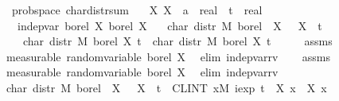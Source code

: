 \documentclass[leqno]{article}
\theoremstyle{definition}
\begin{document}
\begin{isabellebody}
\isamarkupfalse%
\ {\isacharparenleft}\ prob{\isacharunderscore}space{\isacharparenright}\ char{\isacharunderscore}distr{\isacharunderscore}sum{\isacharcolon}\isanewline
\ \ \ X{}\ X{}\ {\isacharcolon}{\isacharcolon}\ {\isachardoublequoteopen}{\isacharprime}a\ {\isasymRightarrow}\ real{\isachardoublequoteclose}\ \ t\ {\isacharcolon}{\isacharcolon}\ real\isanewline
\ \ \ {\isachardoublequoteopen}indep{\isacharunderscore}var\ borel\ X{}\ borel\ X{}{\isachardoublequoteclose}\isanewline
\ \ \ {\isachardoublequoteopen}char\ {\isacharparenleft}distr\ M\ borel\ {\isacharparenleft}{\isasymlambda}{\isasymomega}{\isachardot}\ X{}\ {\isasymomega}\ {\isacharplus}\ X{}\ {\isasymomega}{\isacharparenright}{\isacharparenright}\ t\ {\isacharequal}\isanewline
\ \ \ \ char\ {\isacharparenleft}distr\ M\ borel\ X{}{\isacharparenright}\ t\ {\isacharasterisk}\ char\ {\isacharparenleft}distr\ M\ borel\ X{}{\isacharparenright}\ t{\isachardoublequoteclose}\isanewline
{}\isamarkupfalse%
\ {\isacharminus}\isanewline
\ \ \isamarkupfalse%
\ assms\ \isamarkupfalse%
\ {\isacharbrackleft}measurable{\isacharbrackright}{\isacharcolon}\ {\isachardoublequoteopen}random{\isacharunderscore}variable\ borel\ X{}{\isachardoublequoteclose}\ \isamarkupfalse%
\ {\isacharparenleft}elim\ indep{\isacharunderscore}var{\isacharunderscore}rv{}{\isacharparenright}\isanewline
\ \ \isamarkupfalse%
\ assms\ \isamarkupfalse%
\ {\isacharbrackleft}measurable{\isacharbrackright}{\isacharcolon}\ {\isachardoublequoteopen}random{\isacharunderscore}variable\ borel\ X{}{\isachardoublequoteclose}\ \isamarkupfalse%
\ {\isacharparenleft}elim\ indep{\isacharunderscore}var{\isacharunderscore}rv{}{\isacharparenright}\isanewline
\isanewline
\ \ \isamarkupfalse%
\ {\isachardoublequoteopen}char\ {\isacharparenleft}distr\ M\ borel\ {\isacharparenleft}{\isasymlambda}{\isasymomega}{\isachardot}\ X{}\ {\isasymomega}\ {\isacharplus}\ X{}\ {\isasymomega}{\isacharparenright}{\isacharparenright}\ t\ {\isacharequal}\ {\isacharparenleft}CLINT\ x{\isacharbar}M{\isachardot}\ iexp\ {\isacharparenleft}t\ {\isacharasterisk}\ {\isacharparenleft}X{}\ x\ {\isacharplus}\ X{}\ x{\isacharparenright}{\isacharparenright}{\isacharparenright}{\isachardoublequoteclose}\isanewline

\end{isabellebody}
\end{document}
